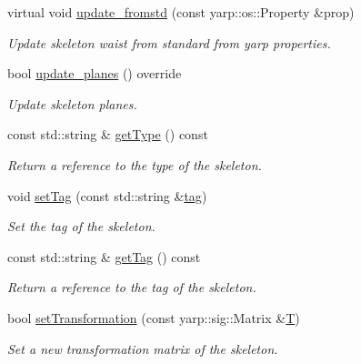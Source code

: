\begin{DoxyCompactItemize}
virtual void \mbox{\hyperlink{classassistive__rehab_1_1SkeletonWaist_a213c2e64f75fd247e1b37ffbc126399f}{update\+\_\+fromstd}} (const yarp\+::os\+::\+Property \&prop)
\begin{DoxyCompactList}\small\item\em Update skeleton waist from standard from yarp properties. \end{DoxyCompactList}\item 
bool \mbox{\hyperlink{classassistive__rehab_1_1SkeletonWaist_aee15b1accdf628b18dac2a372597644a}{update\+\_\+planes}} () override
\begin{DoxyCompactList}\small\item\em Update skeleton planes. \end{DoxyCompactList}\item 
const std\+::string \& \mbox{\hyperlink{classassistive__rehab_1_1Skeleton_a4efc4844bd2b185f1080ee52ab69cb04}{get\+Type}} () const
\begin{DoxyCompactList}\small\item\em Return a reference to the type of the skeleton. \end{DoxyCompactList}\item 
void \mbox{\hyperlink{classassistive__rehab_1_1Skeleton_ae1c830e3d9a0ba692e5ae297caa52a82}{set\+Tag}} (const std\+::string \&\mbox{\hyperlink{classassistive__rehab_1_1Skeleton_a3d1ce5280300e012826948dc4383c2cb}{tag}})
\begin{DoxyCompactList}\small\item\em Set the tag of the skeleton. \end{DoxyCompactList}\item 
const std\+::string \& \mbox{\hyperlink{classassistive__rehab_1_1Skeleton_a185654045d5e43b3853cdb8fdd676da6}{get\+Tag}} () const
\begin{DoxyCompactList}\small\item\em Return a reference to the tag of the skeleton. \end{DoxyCompactList}\item 
bool \mbox{\hyperlink{classassistive__rehab_1_1Skeleton_a3486cbd7f59e75c1d9ef26cbc05bb72f}{set\+Transformation}} (const yarp\+::sig\+::\+Matrix \&\mbox{\hyperlink{classassistive__rehab_1_1Skeleton_a358a1c5eb23a562f8558ff8d43583ef7}{T}})
\begin{DoxyCompactList}\small\item\em Set a new transformation matrix of the skeleton. \end{DoxyCompactList}\item 

\end{DoxyCompactItemize}
